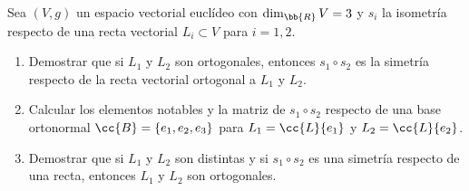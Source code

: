 \documentclass[12pt]{article}
\begin{document}
    \begin{ejercicio}[3.5 puntos]
        Sea $(V,g)$ un espacio vectorial euclídeo con $\dim_{\bb{R}}V=3$ y $s_i$ la isometría respecto de una recta vectorial $L_i \subset V$ para $i=1,2$.

        \begin{enumerate}
            \item Demostrar que si $L_1$ y $L_2$ son ortogonales, entonces $s_1 \circ s_2$ es la simetría respecto de la recta vectorial ortogonal a $L_1$ y $L_2$.
            \item Calcular los elementos notables y la matriz de $s_1 \circ s_2$ respecto de una base ortonormal $\cc{B}=\{e_1,e_2,e_3\}$ para $L_1=\cc{L}\{e_1\}$ y $L_2=\cc{L}\{e_2\}$.
            \item Demostrar que si $L_1$ y $L_2$ son distintas y si $s_1 \circ s_2$ es una simetría respecto de una recta, entonces $L_1$ y $L_2$ son ortogonales.
        \end{enumerate}
    \end{ejercicio}

   
\end{document}
